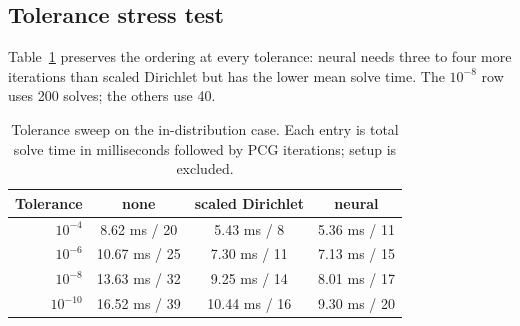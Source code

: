 \documentclass{article}
\newcommand{\skel}{\Gamma} %
\theoremstyle{plain}
\numberwithin{equation}{section}
\begin{document}



\subsection{Tolerance stress test}

Table~\ref{tab:nn-tolerance} preserves the ordering at every tolerance: neural
needs three to four more iterations than scaled Dirichlet but has the lower
mean solve time.  The $10^{-8}$ row uses 200 solves; the others use 40.

\begin{table}[ht]
    \centering
    \caption{Tolerance sweep on the in-distribution case.  Each entry is total
        solve time in milliseconds followed by PCG iterations; setup is excluded.}
    \label{tab:nn-tolerance}
    \begin{tabular}{rccc}
        \toprule
        Tolerance  & none          & scaled Dirichlet & neural       \\
        \midrule
        $10^{-4}$  & 8.62 ms / 20  & 5.43 ms / 8      & 5.36 ms / 11 \\
        $10^{-6}$  & 10.67 ms / 25 & 7.30 ms / 11     & 7.13 ms / 15 \\
        $10^{-8}$  & 13.63 ms / 32 & 9.25 ms / 14     & 8.01 ms / 17 \\
        $10^{-10}$ & 16.52 ms / 39 & 10.44 ms / 16    & 9.30 ms / 20 \\
        \bottomrule
    \end{tabular}
\end{table}
\end{document}
